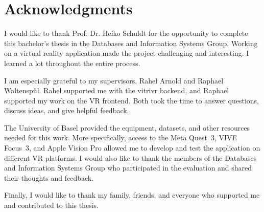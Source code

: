 \chapter{Acknowledgments}

I would like to thank Prof. Dr. Heiko Schuldt for the opportunity to complete this bachelor’s thesis in the Databases and Information Systems Group. Working on a virtual reality application made the project challenging and interesting. I learned a lot throughout the entire process.

I am especially grateful to my supervisors, Rahel Arnold and Raphael Waltenspül. Rahel supported me with the vitrivr backend, and Raphael supported my work on the VR frontend. Both took the time to answer questions, discuss ideas, and give helpful feedback.

The University of Basel provided the equipment, datasets, and other resources needed for this work. More specifically, access to the Meta Quest~3, VIVE Focus~3, and Apple Vision Pro allowed me to develop and test the application on different VR platforms. I would also like to thank the members of the Databases and Information Systems Group who participated in the evaluation and shared their thoughts and feedback.

Finally, I would like to thank my family, friends, and everyone who supported me and contributed to this thesis.
